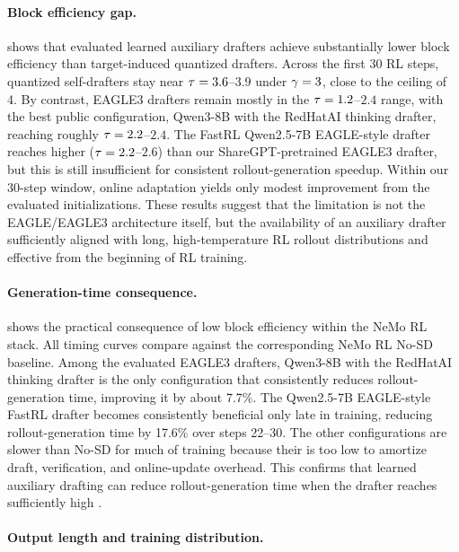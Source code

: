 \paragraph{Block efficiency gap.}

 shows that evaluated learned auxiliary drafters achieve substantially lower block efficiency than target-induced quantized drafters.
Across the first 30 RL steps, quantized self-drafters stay near $\tau{}=3.6$--$3.9$ under $\gamma=3$, close to the ceiling of 4.
By contrast, EAGLE3 drafters remain mostly in the $\tau{}=1.2$--$2.4$ range, with the best public configuration, Qwen3-8B with the RedHatAI thinking drafter, reaching roughly $\tau{}=2.2$--$2.4$.
The FastRL Qwen2.5-7B EAGLE-style drafter reaches higher \MAL{} ($\tau{}=2.2$--$2.6$) than our ShareGPT-pretrained EAGLE3 drafter, but this is still insufficient for consistent rollout-generation speedup.
Within our 30-step window, online adaptation yields only modest \MAL{} improvement from the evaluated initializations.
These results suggest that the limitation is not the EAGLE/EAGLE3 architecture itself, but the availability of an auxiliary drafter sufficiently aligned with long, high-temperature RL rollout distributions and effective from the beginning of RL training.


\paragraph{Generation-time consequence.}

 shows the practical consequence of low block efficiency within the NeMo RL stack.
All timing curves compare \learned{} against the corresponding NeMo RL No-SD baseline.
Among the evaluated EAGLE3 drafters, Qwen3-8B with the RedHatAI thinking drafter is the only configuration that consistently reduces rollout-generation time, improving it by about 7.7\%.
The Qwen2.5-7B EAGLE-style FastRL drafter becomes consistently beneficial only late in training, reducing rollout-generation time by 17.6\% over steps 22--30.
The other configurations are slower than No-SD for much of training because their \MAL{} is too low to amortize draft, verification, and online-update overhead.
This confirms that learned auxiliary drafting can reduce rollout-generation time when the drafter reaches sufficiently high \MAL{}.


\paragraph{Output length and training distribution.}

